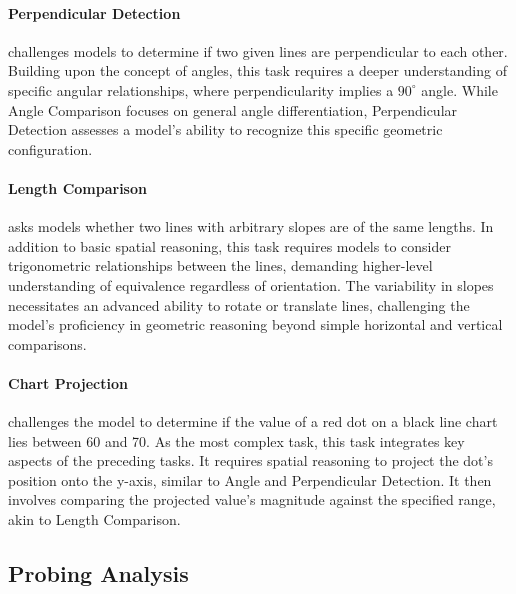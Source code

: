 \paragraph{Perpendicular Detection} challenges models to determine if two given lines are perpendicular to each other. Building upon the concept of angles, this task requires a deeper understanding of specific angular relationships, where perpendicularity implies a $90^\circ$ angle.  While Angle Comparison focuses on general angle differentiation, Perpendicular Detection assesses a model's ability to recognize this specific geometric configuration. 
\vspace{-2mm}

\paragraph{Length Comparison} asks models whether two lines with arbitrary slopes are of the same lengths. In addition to basic spatial reasoning, this task requires models to consider trigonometric relationships between the lines, demanding higher-level understanding of equivalence regardless of orientation. The variability in slopes necessitates an advanced ability to rotate or translate lines, challenging the model's proficiency in geometric reasoning beyond simple horizontal and vertical comparisons.


\vspace{-2mm}
\paragraph{Chart Projection} challenges the model to determine if the value of a red dot on a black line chart lies between 60 and 70. As the most complex task, this task integrates key aspects of the preceding tasks. It requires spatial reasoning to project the dot's position onto the y-axis, similar to Angle and Perpendicular Detection. It then involves comparing the projected value's magnitude against the specified range, akin to Length Comparison. %




\subsection{Probing Analysis}
\label{subsec:probing_analysis}

